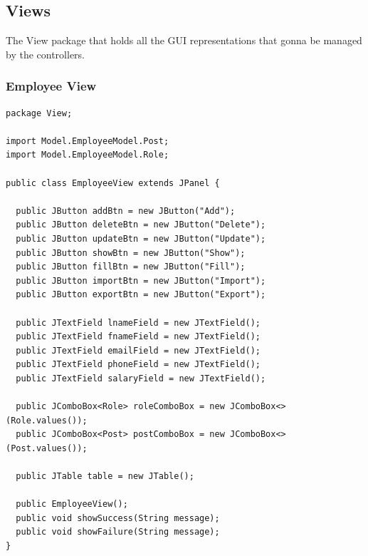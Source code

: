 \documentclass[12pt]{article}
\begin{document}
\pagebreak

\subsection{Views}

The View package that holds all the GUI representations that gonna be
managed by the controllers.

\subsubsection{Employee View}
\begin{lstlisting}
package View;

import Model.EmployeeModel.Post;
import Model.EmployeeModel.Role;

public class EmployeeView extends JPanel {

  public JButton addBtn = new JButton("Add");
  public JButton deleteBtn = new JButton("Delete");
  public JButton updateBtn = new JButton("Update");
  public JButton showBtn = new JButton("Show");
  public JButton fillBtn = new JButton("Fill");
  public JButton importBtn = new JButton("Import");
  public JButton exportBtn = new JButton("Export");

  public JTextField lnameField = new JTextField();
  public JTextField fnameField = new JTextField();
  public JTextField emailField = new JTextField();
  public JTextField phoneField = new JTextField();
  public JTextField salaryField = new JTextField();

  public JComboBox<Role> roleComboBox = new JComboBox<>(Role.values());
  public JComboBox<Post> postComboBox = new JComboBox<>(Post.values());

  public JTable table = new JTable();

  public EmployeeView();
  public void showSuccess(String message);
  public void showFailure(String message);
}
\end{lstlisting}

\pagebreak
\end{document}
